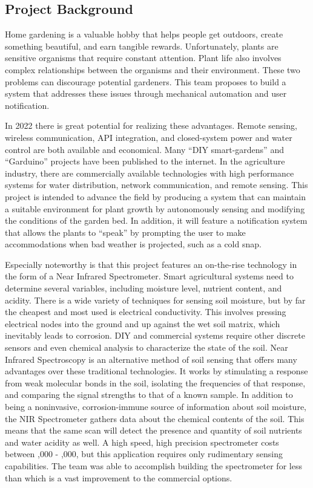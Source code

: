 \subsection{Project Background}
Home gardening is a valuable hobby that helps people get outdoors, create something beautiful, and earn tangible rewards. Unfortunately, plants are sensitive organisms that require constant attention. Plant life also involves complex relationships between the organisms and their environment. These two problems can discourage potential gardeners. This team proposes to build a system that addresses these issues through mechanical automation and user notification.

In 2022 there is great potential for realizing these advantages. Remote sensing, wireless communication, API integration, and closed-system power and water control are both available and economical. Many “DIY smart-gardens” and “Garduino” projects have been published to the internet. In the agriculture industry, there are commercially available technologies with high performance systems for water distribution, network communication, and remote sensing. This project is intended to advance the field by producing a system that can maintain a suitable environment for plant growth by autonomously sensing and modifying the conditions of the garden bed. In addition, it will feature a notification system that allows the plants to “speak” by prompting the user to make accommodations when bad weather is projected, such as a cold snap.

Especially noteworthy is that this project features an on-the-rise technology in the form of a Near Infrared Spectrometer. Smart agricultural systems need to determine several variables, including moisture level, nutrient content, and acidity. There is a wide variety of techniques for sensing soil moisture, but by far the cheapest and most used is electrical conductivity. This involves pressing electrical nodes into the ground and up against the wet soil matrix, which inevitably leads to corrosion. DIY and commercial systems require other discrete sensors and even chemical analysis to characterize the state of the soil. Near Infrared Spectroscopy is an alternative method of soil sensing that offers many advantages over these traditional technologies. It works by stimulating a response from weak molecular bonds in the soil, isolating the frequencies of that response, and comparing the signal strengths to that of a known sample. In addition to being a noninvasive, corrosion-immune source of information about soil moisture, the NIR Spectrometer gathers data about the chemical contents of the soil. This means that the same scan will detect the presence and quantity of soil nutrients and water acidity as well. A high speed, high precision spectrometer costs between ,000 - ,000, but this application requires only rudimentary sensing capabilities. The team was able to accomplish building the spectrometer for less than  which is a vast improvement to the commercial options.

